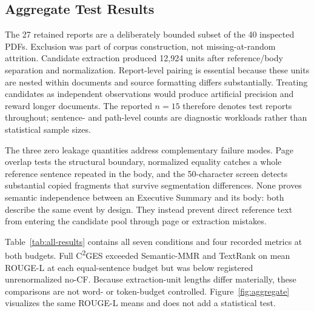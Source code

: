 \documentclass[applsci,article,submit,moreauthors]{Definitions/mdpi}
\newcommand{\cges}{C\textsuperscript{2}GES}
\begin{document}
\subsection{Aggregate Test Results}

The 27 retained reports are a deliberately bounded subset of the 40 inspected PDFs. Exclusion was part of corpus construction, not missing-at-random attrition. Candidate extraction produced 12,924 units after reference/body separation and normalization. Report-level pairing is essential because these units are nested within documents and source formatting differs substantially. Treating candidates as independent observations would produce artificial precision and reward longer documents. The reported $n=15$ therefore denotes test reports throughout; sentence- and path-level counts are diagnostic workloads rather than statistical sample sizes.

The three zero leakage quantities address complementary failure modes. Page overlap tests the structural boundary, normalized equality catches a whole reference sentence repeated in the body, and the 50-character screen detects substantial copied fragments that survive segmentation differences. None proves semantic independence between an Executive Summary and its body: both describe the same event by design. They instead prevent direct reference text from entering the candidate pool through page or extraction mistakes.

Table~\ref{tab:all-results} contains all seven conditions and four recorded metrics at both budgets. Full \cges{} exceeded Semantic-MMR and TextRank on mean ROUGE-L at each equal-sentence budget but was below registered unrenormalized no-CF. Because extraction-unit lengths differ materially, these comparisons are not word- or token-budget controlled. Figure~\ref{fig:aggregate} visualizes the same ROUGE-L means and does not add a statistical test.
\end{document}
